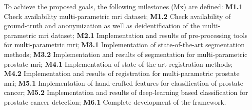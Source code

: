 To achieve the proposed goals, the following milestones (Mx) are defined:
\textbf{M1.1} Check availability multi-parametric \ac{mri} dataset;
\textbf{M1.2} Check availability of ground-truth and anonymization as well as deidentification of the multi-parametric \ac{mri} dataset;
\textbf{M2.1} Implementation and results of pre-processing tools for multi-parametric \ac{mri};
\textbf{M3.1} Implementation of state-of-the-art segmentation methods;
\textbf{M3.2} Implementation and results of segmentation for multi-parametric prostate \ac{mri};
\textbf{M4.1} Implementation of state-of-the-art registration methods;
\textbf{M4.2} Implementation and results of registration for multi-parametric prostate \ac{mri};
\textbf{M5.1} Implementation of hand-crafted features for classification of prostate cancer;
\textbf{M5.2} Implementation and results of deep-learning based classification for prostate cancer detection;
\textbf{M6.1} Complete development of the framework.

